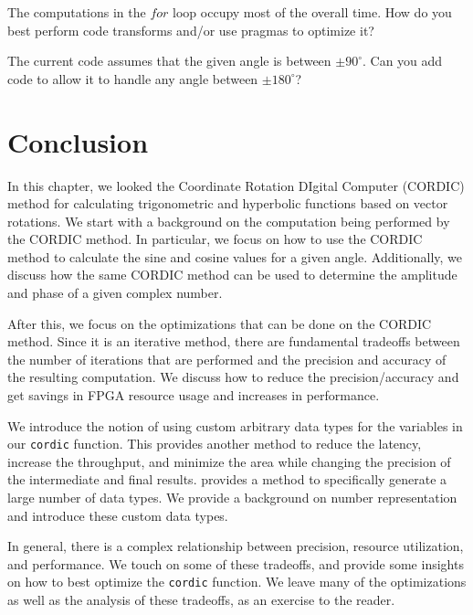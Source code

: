 \begin{exercise}
The computations in the $for$ loop occupy most of the overall time. How do you best perform code transforms and/or use pragmas to optimize it?
\end{exercise}

\begin{exercise}
The current code assumes that the given angle is between $\pm 90^{\circ}$. Can you add code to allow it to handle any angle between $\pm 180^{\circ}$?
\end{exercise}

\section{Conclusion}
In this chapter, we looked the Coordinate Rotation DIgital Computer (CORDIC) method for calculating trigonometric and hyperbolic functions based on vector rotations. We start with a background on the computation being performed by the CORDIC method. In particular, we focus on how to use the CORDIC method to calculate the sine and cosine values for a given angle. Additionally, we discuss how the same CORDIC method can be used to determine the amplitude and phase of a given complex number.

After this, we focus on the optimizations that can be done on the CORDIC method. Since it is an iterative method, there are fundamental tradeoffs between the number of iterations that are performed and the precision and accuracy of the resulting computation. We discuss how to reduce the precision/accuracy and get savings in FPGA resource usage and increases in performance.

We introduce the notion of using custom arbitrary data types for the variables in our \lstinline{cordic} function. This provides another method to reduce the latency, increase the throughput, and minimize the area while changing the precision of the intermediate and final results. \VHLS provides a method to specifically generate a large number of data types. We provide a background on number representation and introduce these custom data types. 

In general, there is a complex relationship between precision, resource utilization, and performance. We touch on some of these tradeoffs, and provide some insights on how to best optimize the \lstinline{cordic} function. We leave many of the optimizations as well as the analysis of these tradeoffs, as an exercise to the reader. %